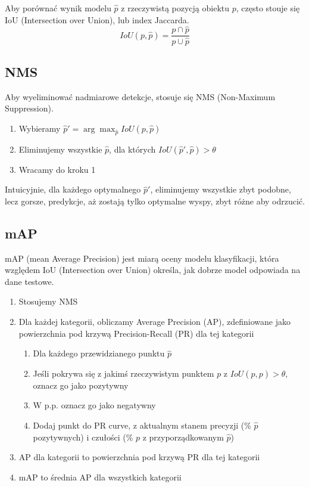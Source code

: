 \documentclass{../notatki}
\begin{document}
Aby porównać wynik modelu $\hat{p}$ z rzeczywistą pozycją obiektu $p$,
często stouje się IoU (Intersection over Union), lub index Jaccarda.
$$
IoU(p, \hat{p}) = \frac{p \cap \hat{p}}{p \cup \hat{p}}
$$

\subsection{NMS}

Aby wyeliminować nadmiarowe detekcje, stosuje się NMS (Non-Maximum Suppression).
\begin{enumerate}
  \item Wybieramy $\hat{p}' = \arg\max_{\hat{p}} IoU(p, \hat{p})$
  \item Eliminujemy wszystkie $\hat{p}$, dla których $IoU(\hat{p}',
    \hat{p}) > \theta$
  \item Wracamy do kroku 1
\end{enumerate}
Intuicyjnie, dla każdego optymalnego $\hat{p}'$, eliminujemy wszystkie zbyt
podobne, lecz gorsze, predykcje, aż zostają tylko optymalne wyspy, zbyt różne
aby odrzucić.

\subsection{mAP}

mAP (mean Average Precision) jest miarą oceny modelu klasyfikacji, która
względem IoU (Intersection over Union) określa, jak dobrze model
odpowiada na dane testowe.

\begin{enumerate}
  \item Stosujemy NMS
  \item Dla każdej kategorii, obliczamy Average Precision (AP),
    zdefiniowane jako powierzchnia pod krzywą Precision-Recall (PR)
    dla tej kategorii
    \begin{enumerate}
      \item Dla każdego przewidzianego punktu $\hat{p}$
      \item Jeśli pokrywa się z jakimś rzeczywistym punktem $p$ z
        $IoU(\hat{p}, p) > \theta$, oznacz go jako pozytywny
      \item W p.p. oznacz go jako negatywny
      \item Dodaj punkt do PR curve, z aktualnym stanem precyzji (\%
        $\hat{p}$ pozytywnych) i czułości (\% $p$ z przyporządkowanym $\hat{p}$)
    \end{enumerate}
  \item AP dla kategorii to powierzchnia pod krzywą PR dla tej kategorii
  \item mAP to średnia AP dla wszystkich kategorii
\end{enumerate}
\end{document}
